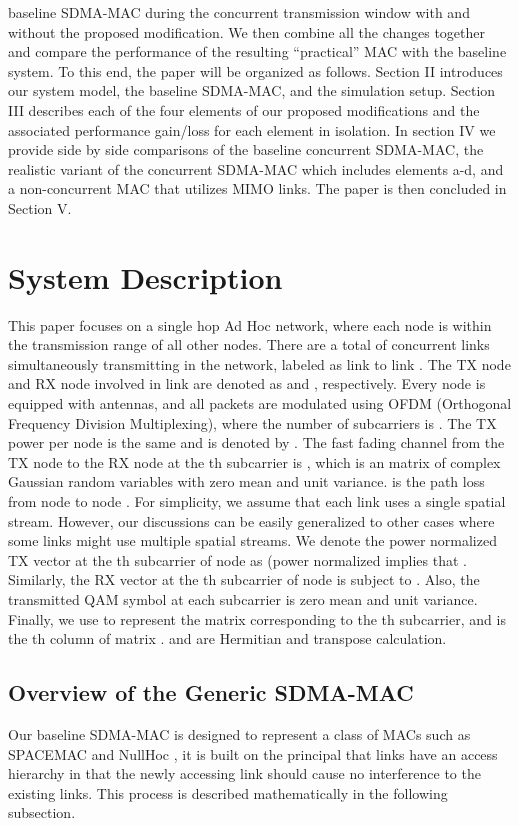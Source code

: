 \documentclass[journal, final]{IEEEtran}
\begin{document}
baseline SDMA-MAC during the concurrent transmission window with and without
the proposed modification. We then combine all the changes together and
compare the performance of the resulting ``practical'' MAC with the baseline
system. To this end, the paper will be organized as follows. Section II
introduces our system model, the baseline SDMA-MAC, and the simulation setup.
Section III describes each of the four elements of our proposed
modifications and the associated performance gain/loss for each element in
isolation. In section IV we provide side by side comparisons of the baseline
concurrent SDMA-MAC, the realistic variant of the concurrent SDMA-MAC which
includes elements a-d, and a non-concurrent MAC that utilizes MIMO links.
The paper is then concluded in Section V.

\section{System Description}

This paper focuses on a single hop Ad Hoc network, where each node is within
the transmission range of all other nodes. There are a total of  concurrent links simultaneously transmitting in the network,
labeled as link  to link . The TX node and RX node involved in
link  are denoted as  and , respectively. Every node is equipped with
 antennas, and all packets are modulated
using OFDM (Orthogonal Frequency Division Multiplexing), where the number of subcarriers is . The TX power per
node is the same and is denoted by .  The fast fading
channel from the TX node  to the RX node  at the th
subcarrier is , which is an 
matrix of complex Gaussian random variables with zero mean and unit
variance.  is
the path loss from node  to node . For simplicity, we assume that each link uses a single
spatial stream. However, our discussions can be easily generalized to other
cases where some links might use multiple spatial streams. We denote the
power normalized  TX vector at the th subcarrier of node
 as  (power normalized implies that . Similarly, the RX
vector at the th subcarrier of node  is 
subject to . Also, the transmitted QAM symbol at each subcarrier is zero mean and unit variance. Finally, we use  to represent the matrix corresponding to the th subcarrier, and
 is the th column of matrix .  and  are Hermitian and transpose calculation.

\subsection{Overview of the Generic SDMA-MAC}
Our baseline SDMA-MAC is designed to represent a class of MACs such as
SPACEMAC \cite{1_SPACEMAC, 2_MIMOMAN} and NullHoc \cite{3_NULLHOC, 4_nullhoc}, it is built on the principal that links
have an access hierarchy in that the newly accessing link should cause no interference to the existing links. This
process is described mathematically in the following subsection.
\end{document}
